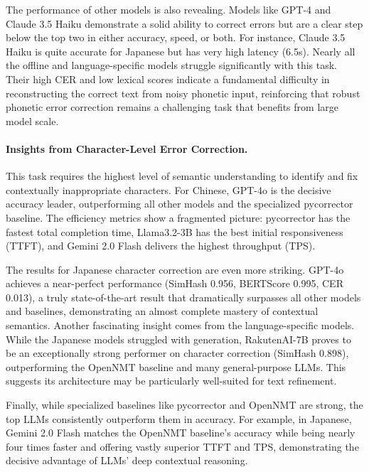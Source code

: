 \documentclass[10pt, a4paper]{article}
\begin{document}
The performance of other models is also revealing. Models like {GPT-4} and {Claude 3.5 Haiku} demonstrate a solid ability to correct errors but are a clear step below the top two in either accuracy, speed, or both. For instance, {Claude 3.5 Haiku} is quite accurate for Japanese but has very high latency (6.5s). Nearly all the offline and language-specific models struggle significantly with this task. Their high CER and low lexical scores indicate a fundamental difficulty in reconstructing the correct text from noisy phonetic input, reinforcing that robust phonetic error correction remains a challenging task that benefits from large model scale.

\paragraph{Insights from Character-Level Error Correction.}
This task requires the highest level of semantic understanding to identify and fix contextually inappropriate characters. For {Chinese}, {GPT-4o} is the decisive accuracy leader, outperforming all other models and the specialized {pycorrector} baseline. The efficiency metrics show a fragmented picture: {pycorrector} has the fastest total completion time, {Llama3.2-3B} has the best initial responsiveness (TTFT), and {Gemini 2.0 Flash} delivers the highest throughput (TPS).

The results for {Japanese character correction} are even more striking. {GPT-4o} achieves a near-perfect performance (SimHash 0.956, BERTScore 0.995, CER 0.013), a truly state-of-the-art result that dramatically surpasses all other models and baselines, demonstrating an almost complete mastery of contextual semantics. Another fascinating insight comes from the language-specific models. While the Japanese models struggled with generation, {RakutenAI-7B} proves to be an exceptionally strong performer on character correction (SimHash 0.898), outperforming the {OpenNMT} baseline and many general-purpose LLMs. This suggests its architecture may be particularly well-suited for text refinement.

Finally, while specialized baselines like {pycorrector} and {OpenNMT} are strong, the top LLMs consistently outperform them in accuracy. For example, in Japanese, {Gemini 2.0 Flash} matches the {OpenNMT} baseline's accuracy while being nearly four times faster and offering vastly superior TTFT and TPS, demonstrating the decisive advantage of LLMs' deep contextual reasoning.
\end{document}
